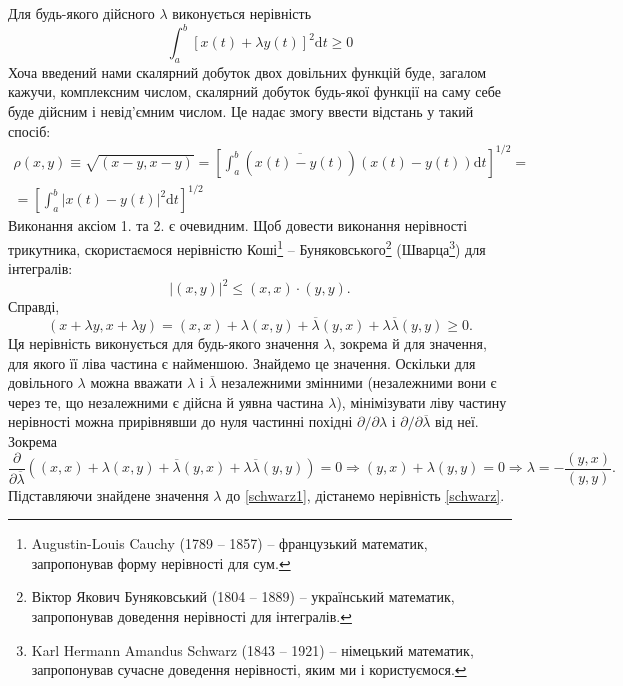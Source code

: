\documentclass[14pt,twoside]{extreport}
\theoremstyle{mystyle}
\numberwithin{equation}{chapter}
\begin{document}
\begin{enumerate}
 Для будь-якого дійсного $\lambda$ виконується нерівність
 \[
 \int_{a}^{b} [x(t) + \lambda y(t)]^2 \mathrm{d}t \geqslant 0
 \]
 Хоча введений нами скалярний добуток двох довільних функцій буде, загалом кажучи, комплексним числом, скалярний добуток будь-якої функції на саму себе буде дійсним і невід'ємним числом. Це надає змогу ввести відстань у такий спосіб:
 \begin{multline*}
  \rho(x, y) \equiv \sqrt{(x-y, x-y)} = \displaystyle\left[\int_{a}^{b}(\overline{x(t)-y(t)})(x(t) - y(t)) \mathrm{d}t\right]^{1/2} =\\
  \displaystyle= \left[\int_{a}^{b}|x(t)-y(t)|^2 \mathrm{d}t\right]^{1/2}
 \end{multline*}
 Виконання аксіом 1. та 2. є очевидним. Щоб довести виконання нерівності трикутника, скористаємося нерівністю Коші\footnote{Augustin-Louis Cauchy (1789 -- 1857) -- французький математик, запропонував форму нерівності для сум.} -- Буняковського\footnote{Віктор Якович Буняковський (1804 -- 1889) -- український математик, запропонував доведення нерівності для інтегралів.} (Шварца\footnote{Karl Hermann Amandus Schwarz (1843 -- 1921) -- німецький математик, запропонував сучасне доведення нерівності, яким ми і користуємося.}) для інтегралів:
 \begin{equation}\label{schwarz}
  |(x, y)|^2 \leqslant (x, x) \cdot (y, y).
 \end{equation}
 Справді,
 \begin{equation}\label{schwarz1}
  (x+\lambda y, x+ \lambda y) = (x, x) + \lambda (x, y) + \overline{\lambda} (y, x) + \lambda\overline{\lambda}(y, y) \geqslant 0.
 \end{equation}
  Ця нерівність виконується для будь-якого значення $\lambda$, зокрема й для значення, для якого її ліва частина є найменшою. Знайдемо це значення. Оскільки для довільного $\lambda$ можна вважати $\lambda$ і $\overline{\lambda}$ незалежними змінними (незалежними вони є через те, що незалежними є дійсна й уявна частина $\lambda$), мінімізувати ліву частину нерівності можна прирівнявши до нуля частинні похідні $\partial/\partial\lambda$ і $\partial/\partial\overline{\lambda}$ від неї. Зокрема
 \[
  \dfrac{\partial}{\partial \overline{\lambda}}((x, x) + \lambda (x, y) + \overline{\lambda} (y, x) + \lambda\overline{\lambda}(y, y))=0 \Rightarrow (y,x) +\lambda(y,y) =0 \Rightarrow \lambda = -\dfrac{(y, x)}{(y, y)}.
 \]
 Підставляючи знайдене значення $\lambda$ до \eqref{schwarz1}, дістанемо нерівність \eqref{schwarz}.


\end{enumerate}
\end{document}
